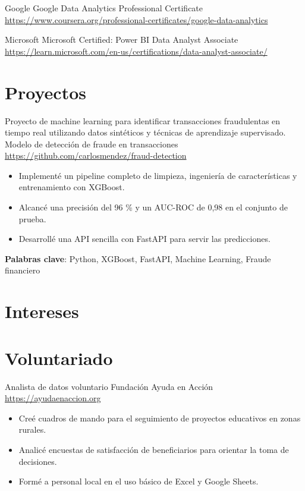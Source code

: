 \documentclass[a4paper, serif, 10pt]{moderncv}
\begin{document}
        {Google}
        {Google Data Analytics Professional Certificate}
        {\url{https://www.coursera.org/professional-certificates/google-data-analytics}}
        {}
        {}

        {Microsoft}
        {Microsoft Certified: Power BI Data Analyst Associate}
        {\url{https://learn.microsoft.com/en-us/certifications/data-analyst-associate/}}
        {}
        {}
\section{Proyectos}

        {Proyecto de machine learning para identificar transacciones fraudulentas en tiempo real utilizando datos sintéticos y técnicas de aprendizaje supervisado.}
        {Modelo de detección de fraude en transacciones}
        {\url{https://github.com/carlosmendez/fraud-detection}}
        {}
        {\begin{itemize}
\item Implementé un pipeline completo de limpieza, ingeniería de características y entrenamiento con XGBoost.
\item Alcancé una precisión del 96 \% y un AUC-ROC de 0,98 en el conjunto de prueba.
\item Desarrollé una API sencilla con FastAPI para servir las predicciones.
\end{itemize}
\textbf{Palabras clave}: Python, XGBoost, FastAPI, Machine Learning, Fraude financiero}
\section{Intereses}

\section{Voluntariado}

        {Analista de datos voluntario}
        {Fundación Ayuda en Acción}
        {\url{https://ayudaenaccion.org}}
        {}
        {\begin{itemize}
\item Creé cuadros de mando para el seguimiento de proyectos educativos en zonas rurales.
\item Analicé encuestas de satisfacción de beneficiarios para orientar la toma de decisiones.
\item Formé a personal local en el uso básico de Excel y Google Sheets.
\end{itemize}}
\end{document}
